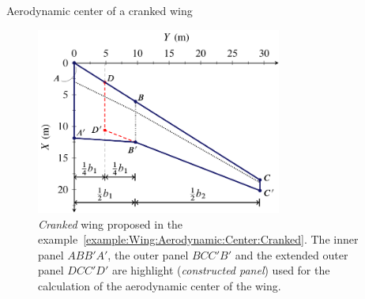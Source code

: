 \documentclass[[12pt,twoside]{book}
\begin{document}
\begin{myExampleX}{Aerodynamic center of a cranked wing}{\ \myIconGraph\ }
\medskip
\noindent
{}

\begin{figure}[t]%
  \centering
    \includegraphics[width=0.72\textwidth]{Chapter_2/aerodynamic_center_of_a_cranked_wing/wing_ac_cranked_1_drawing_panels.pdf}%
  \caption{
          \emph{Cranked} wing proposed in the example~\ref{example:Wing:Aerodynamic:Center:Cranked}.
          The inner panel $ABB'A'$, the outer panel $BCC'B'$ and the extended outer panel $DCC'D'$ are highlight
          (\emph{constructed panel}) used for the calculation of the aerodynamic center of the wing.
  }
  \label{fig:Wing:Aerodynamic:Center:Cranked:Panels}%
\end{figure}%


\end{myExampleX}
\end{document}
